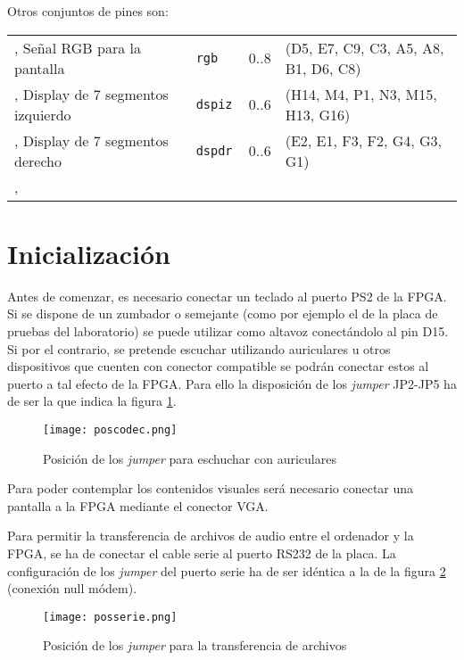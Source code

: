 \documentclass{article}
\begin{document}
	\bigskip Otros conjuntos de pines son:

\medskip \begin{tabu}{| X[5, l] | >{\tt}X[1,l] | X[1, l] | X[5, l] |}
	\sep
	Señal RGB para la pantalla & rgb & 0..8 & (D5, E7, C9, C3, A5, A8, B1, D6, C8) \\ \sep
	Display de 7 segmentos izquierdo & dspiz & 0..6 & (H14, M4, P1, N3, M15, H13, G16) \\ \sep
	Display de 7 segmentos derecho & dspdr & 0..6 & (E2, E1, F3, F2, G4, G3, G1) \\ \sep
\end{tabu} 

\section{Inicialización}

	Antes de comenzar, es necesario conectar un teclado al puerto PS2 de la FPGA. Si se dispone de un zumbador o semejante (como por ejemplo el de la placa de pruebas del laboratorio) se puede utilizar como altavoz conectándolo al pin {\color{blue} D15}. Si por el contrario, se pretende escuchar utilizando auriculares u otros dispositivos que cuenten con conector compatible se podrán conectar estos al puerto a tal efecto de la FPGA. Para ello la disposición de los {\itshape jumper} JP2-JP5 ha de ser la que indica la figura \ref{fig:jump}.

\begin{figure}[ht] \centering
	\texttt{[image: poscodec.png]}

	\caption{Posición de los {\itshape jumper} para eschuchar con auriculares}
	\label{fig:jump}
\end{figure}


	\medskip Para poder contemplar los contenidos visuales será necesario conectar una pantalla a la FPGA mediante el conector VGA.

	\medskip Para permitir la transferencia de archivos de audio entre el ordenador y la FPGA, se ha de conectar el cable serie al puerto RS232 de la placa. La configuración de los {\itshape jumper} del puerto serie ha de ser idéntica a la de la figura \ref{fig:rs232} (conexión null módem).

\begin{figure}[ht] \centering
	\texttt{[image: posserie.png]}

	\caption{Posición de los {\itshape jumper} para la transferencia de archivos}
	\label{fig:rs232}
\end{figure}
\end{document}
